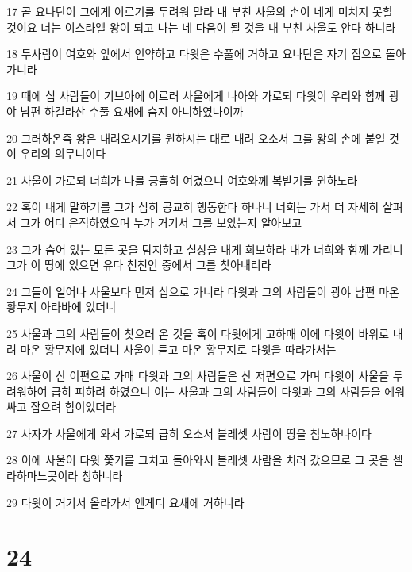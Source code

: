 \par 17 곧 요나단이 그에게 이르기를 두려워 말라 내 부친 사울의 손이 네게 미치지 못할 것이요 너는 이스라엘 왕이 되고 나는 네 다음이 될 것을 내 부친 사울도 안다 하니라
\par 18 두사람이 여호와 앞에서 언약하고 다윗은 수풀에 거하고 요나단은 자기 집으로 돌아가니라
\par 19 때에 십 사람들이 기브아에 이르러 사울에게 나아와 가로되 다윗이 우리와 함께 광야 남편 하길라산 수풀 요새에 숨지 아니하였나이까
\par 20 그러하온즉 왕은 내려오시기를 원하시는 대로 내려 오소서 그를 왕의 손에 붙일 것이 우리의 의무니이다
\par 21 사울이 가로되 너희가 나를 긍휼히 여겼으니 여호와께 복받기를 원하노라
\par 22 혹이 내게 말하기를 그가 심히 공교히 행동한다 하나니 너희는 가서 더 자세히 살펴서 그가 어디 은적하였으며 누가 거기서 그를 보았는지 알아보고
\par 23 그가 숨어 있는 모든 곳을 탐지하고 실상을 내게 회보하라 내가 너희와 함께 가리니 그가 이 땅에 있으면 유다 천천인 중에서 그를 찾아내리라
\par 24 그들이 일어나 사울보다 먼저 십으로 가니라 다윗과 그의 사람들이 광야 남편 마온 황무지 아라바에 있더니
\par 25 사울과 그의 사람들이 찾으러 온 것을 혹이 다윗에게 고하매 이에 다윗이 바위로 내려 마온 황무지에 있더니 사울이 듣고 마온 황무지로 다윗을 따라가서는
\par 26 사울이 산 이편으로 가매 다윗과 그의 사람들은 산 저편으로 가며 다윗이 사울을 두려워하여 급히 피하려 하였으니 이는 사울과 그의 사람들이 다윗과 그의 사람들을 에워싸고 잡으려 함이었더라
\par 27 사자가 사울에게 와서 가로되 급히 오소서 블레셋 사람이 땅을 침노하나이다
\par 28 이에 사울이 다윗 쫓기를 그치고 돌아와서 블레셋 사람을 치러 갔으므로 그 곳을 셀라하마느곳이라 칭하니라
\par 29 다윗이 거기서 올라가서 엔게디 요새에 거하니라

\chapter{24}


